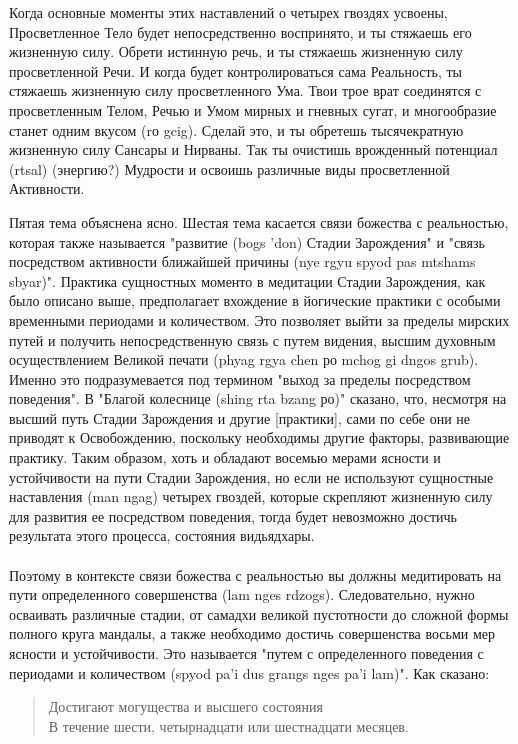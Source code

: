 Когда основные моменты этих наставлений о четырех гвоздях усвоены,
Просветленное Тело будет непосредственно воспринято, и ты стяжаешь его жизненную
силу. Обрети истинную речь, и ты стяжаешь жизненную силу просветленной Речи. И когда
будет контролироваться сама Реальность, ты стяжаешь жизненную силу просветленного
Ума. Твои трое врат соединятся с просветленным Телом, Речью и Умом мирных и гневных
сугат, и многообразие станет одним вкусом (rо gcig). Сделай это, и ты обретешь
тысячекратную жизненную силу Сансары и Нирваны. Так ты очистишь врожденный
потенциал (rtsal) (энергию?) Мудрости и освоишь различные виды просветленной
Активности.\\

\begin{siderules}
Пятая тема объяснена ясно. Шестая тема касается связи божества с реальностью, которая
также называется "развитие (bogs 'don) Стадии Зарождения" и "связь посредством
активности ближайшей причины (nye rgyu spyod pas mtshams sbyar)". Практика сущностных
моменто в медитации Стадии Зарождения, как было описано выше, предполагает вхождение
в йогические практики с особыми временными периодами и количеством. Это позволяет
выйти за пределы мирских путей и получить непосредственную связь с путем видения,
высшим духовным осуществлением Великой печати (phyag rgya chen ро mchog gi dngos grub).
Именно это подразумевается под термином "выход за пределы посредством поведения".
В "Благой колеснице (shing rta bzang ро)" сказано, что, несмотря на высший путь Стадии
Зарождения и другие [практики], сами по себе они не приводят к Освобождению, поскольку
необходимы другие факторы, развивающие практику. Таким образом, хоть и обладают
восемью мерами ясности и устойчивости на пути Стадии Зарождения, но если не используют
сущностные наставления (man ngag) четырех гвоздей, которые скрепляют жизненную силу
для развития ее посредством поведения, тогда будет невозможно достичь результата этого
процесса, состояния видьядхары.\\
\\
Поэтому в контексте связи божества с реальностью вы должны медитировать на пути
определенного совершенства (lam nges rdzogs). Следовательно, нужно осваивать различные
стадии, от самадхи великой пустотности до сложной формы полного круга мандалы, а также
необходимо достичь совершенства восьми мер ясности и устойчивости. Это называется
"путем с определенного поведения с периодами и количеством (spyod pa'i dus grangs nges pa'i lam)".
Как сказано:

\begin{verse}
Достигают могущества и высшего состояния\\
В течение шести, четырнадцати или шестнадцати месяцев.\\
\end{verse}


\end{siderules}
